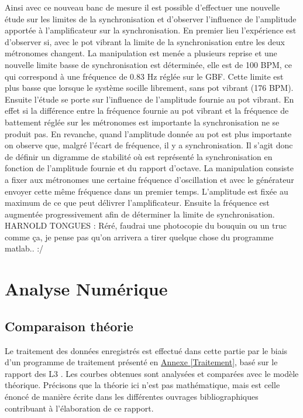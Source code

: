 \documentclass[a4paper,11pt]{report}
\begin{document}
Ainsi avec ce nouveau banc de mesure il est possible d'effectuer une nouvelle étude sur les limites de la synchronisation et d'observer l'influence de l'amplitude apportée à l'amplificateur sur la synchronisation. En premier lieu l'expérience est d'observer si, avec le pot vibrant la limite de la synchronisation entre les deux métronomes changent. La manipulation est menée a plusieurs reprise et une nouvelle limite basse de synchronisation est déterminée, elle est de 100 BPM, ce qui correspond à une fréquence de 0.83 Hz réglée sur le GBF. Cette limite est plus basse que lorsque le système socille librement, sans pot vibrant (176 BPM).\\

	Ensuite l'étude se porte sur l'influence de l'amplitude fournie au pot vibrant. En effet si la différence entre la fréquence fournie au pot vibrant et la fréquence de battement réglée sur les métronomes est importante la synchronisation ne se produit pas. En revanche, quand l'amplitude donnée au pot est plus importante on observe que, malgré l'écart de fréquence, il y a synchronisation. Il s'agit donc de définir un digramme de stabilité où est représenté la synchronisation en fonction de l'amplitude fournie et du rapport d'octave. La manipulation consiste a fixer aux métronomes une certaine fréquence d'oscillation et avec le générateur envoyer cette même fréquence dans un premier temps. L'amplitude est fixée au maximum de ce que peut délivrer l'amplificateur. Ensuite la fréquence est augmentée progressivement afin de déterminer la limite de synchronisation.\\

HARNOLD TONGUES : Réré, faudrai une photocopie du bouquin ou un truc comme ça, je pense pas qu'on arrivera a tirer quelque chose du programme matlab.. :/

\chapter{Analyse Numérique}
\section{Comparaison théorie}
Le traitement des données enregistrés est effectué dans cette partie par le biais d'un programme de traitement présenté en \underline{Annexe \ref{Traitement}}, basé sur le rapport des L3 \cite{ram}. Les courbes obtenues sont analysées et comparées avec le modèle théorique. Précisons que la théorie ici n'est pas mathématique, mais est celle énoncé de manière écrite dans les différentes ouvrages bibliographiques contribuant à l'élaboration de ce rapport.
\end{document}

